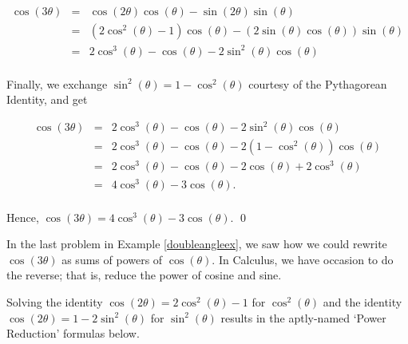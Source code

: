 \documentclass{ximera}
\begin{document}
\begin{example}
\begin{enumerate}
\[ \begin{array}{rcl}

\cos(3\theta) & = &  \cos(2\theta)\cos(\theta) - \sin(2\theta)\sin(\theta) \\  
              & = & \left(2\cos^{2}(\theta) - 1\right) \cos(\theta) - \left(2 \sin(\theta) \cos(\theta) \right)\sin(\theta) \\   
              & = & 2\cos^{3}(\theta)- \cos(\theta) - 2 \sin^2(\theta) \cos(\theta) \\
              
\end{array}\]

Finally, we exchange $\sin^{2}(\theta) = 1 - \cos^{2}(\theta)$ courtesy of the Pythagorean Identity, and get

\[ \begin{array}{rcl}

\cos(3\theta) & = & 2\cos^{3}(\theta)- \cos(\theta) - 2 \sin^2(\theta) \cos(\theta) \\  
              & = & 2\cos^{3}(\theta)- \cos(\theta) - 2 \left(1 - \cos^{2}(\theta)\right) \cos(\theta) \\  
              & = & 2\cos^{3}(\theta)- \cos(\theta) - 2\cos(\theta) + 2\cos^{3}(\theta) \\  
              & = & 4\cos^{3}(\theta)- 3\cos(\theta). \\
\end{array}\]        

 Hence, $\cos(3\theta) = 4\cos^{3}(\theta)- 3\cos(\theta)$.  \qed           
              
\end{enumerate}

\end{example}

In the last problem in Example \ref{doubleangleex}, we saw how we could rewrite $\cos(3\theta)$ as sums of powers of  $\cos(\theta)$.  In Calculus, we have occasion to do the reverse;  that is, reduce the power of cosine and sine. 

 

Solving the identity $\cos(2\theta) = 2\cos^{2}(\theta) -1$ for $\cos^{2}(\theta)$  and the identity $\cos(2\theta) = 1 - 2\sin^{2}(\theta)$ for $\sin^{2}(\theta)$ results in the aptly-named `Power Reduction' formulas below.  

 

\end{document}
